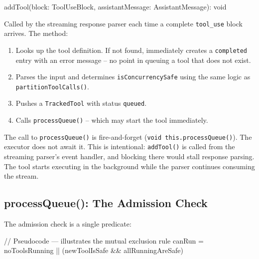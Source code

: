 \documentclass[
  english,
  11pt,
  letterpaper,
]{book}
\newenvironment{Shaded}{\begin{snugshade}}{\end{snugshade}}
\newcommand{\CommentTok}[1]{\textcolor[rgb]{0.37,0.37,0.37}{#1}}
\newcommand{\DataTypeTok}[1]{\textcolor[rgb]{0.68,0.00,0.00}{#1}}
\newcommand{\FunctionTok}[1]{\textcolor[rgb]{0.28,0.35,0.67}{#1}}
\newcommand{\NormalTok}[1]{\textcolor[rgb]{0.00,0.23,0.31}{#1}}
\newcommand{\OperatorTok}[1]{\textcolor[rgb]{0.37,0.37,0.37}{#1}}
\providecommand{\tightlist}{%
  \setlength{\itemsep}{0pt}\setlength{\parskip}{0pt}}
\begin{document}
\begin{Shaded}
\begin{Highlighting}[]
\FunctionTok{addTool}\NormalTok{(block}\OperatorTok{:}\NormalTok{ ToolUseBlock}\OperatorTok{,}\NormalTok{ assistantMessage}\OperatorTok{:}\NormalTok{ AssistantMessage)}\OperatorTok{:} \DataTypeTok{void}
\end{Highlighting}
\end{Shaded}

Called by the streaming response parser each time a complete
\texttt{tool\_use} block arrives. The method:

\begin{enumerate}
\def\labelenumi{\arabic{enumi}.}
\tightlist
\item
  Looks up the tool definition. If not found, immediately creates a
  \texttt{completed} entry with an error message -- no point in queuing
  a tool that does not exist.
\item
  Parses the input and determines \texttt{isConcurrencySafe} using the
  same logic as \texttt{partitionToolCalls()}.
\item
  Pushes a \texttt{TrackedTool} with status
  \texttt{\textquotesingle{}queued\textquotesingle{}}.
\item
  Calls \texttt{processQueue()} -- which may start the tool immediately.
\end{enumerate}

The call to \texttt{processQueue()} is fire-and-forget
(\texttt{void\ this.processQueue()}). The executor does not await it.
This is intentional: \texttt{addTool()} is called from the streaming
parser's event handler, and blocking there would stall response parsing.
The tool starts executing in the background while the parser continues
consuming the stream.

\subsection{processQueue(): The Admission
Check}\label{processqueue-the-admission-check}

The admission check is a single predicate:

\begin{Shaded}
\begin{Highlighting}[]
\CommentTok{// Pseudocode — illustrates the mutual exclusion rule}
\NormalTok{canRun }\OperatorTok{=}\NormalTok{ noToolsRunning }\OperatorTok{||}\NormalTok{ (newToolIsSafe }\OperatorTok{\&\&}\NormalTok{ allRunningAreSafe)}
\end{Highlighting}
\end{Shaded}
\end{document}
